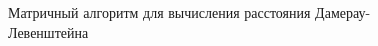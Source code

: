 \documentclass[14pt]{report}
\begin{document}
\begin{figure}
\caption{Матричный алгоритм для вычисления расстояния Дамерау-Левенштейна}
\label{fig:image}
\end{figure}
\end{document}

